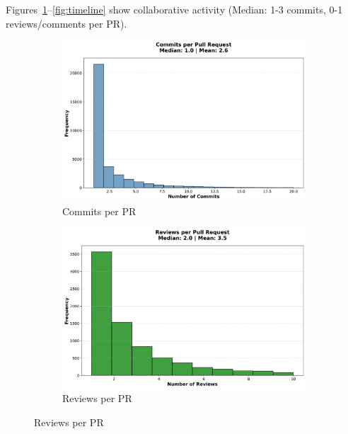 \documentclass[11pt]{article}
\begin{document}
Figures~\ref{fig:commits}--\ref{fig:timeline} show collaborative activity (Median: 1-3 commits, 0-1 reviews/comments per PR).

\begin{figure}[H]
\centering
\begin{subfigure}[b]{0.48\textwidth}
\centering
\includegraphics[width=\textwidth]{figures_individual/10_commits_per_pr_histogram.png}
\caption{Commits per PR}
\label{fig:commits}
\end{subfigure}
\hfill
\begin{subfigure}[b]{0.48\textwidth}
\centering
\includegraphics[width=\textwidth]{figures_individual/13_reviews_per_pr_histogram.png}
\caption{Reviews per PR}
\label{fig:reviews}
\end{subfigure}

\vspace{0.2cm}


\end{figure}
\end{document}
